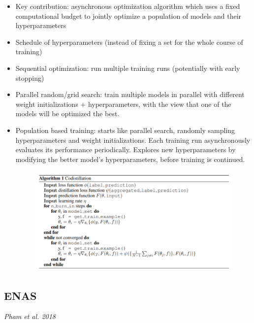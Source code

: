 \begin{itemize}
  \item Key contribution: asynchronous optimization algorithm which uses a fixed computational budget to jointly optimize a population of models and their hyperparameters
  \item Schedule of hyperparameters (instead of fixing a set for the whole course of training)
  \item Sequential optimization: run multiple training runs (potentially with early stopping)
  \item Parallel random/grid search: train multiple models in parallel with different weight initializations + hyperparameters, with the view that one of the models will be optimized the best.
  \item Population based training: starts like parallel search, randomly sampling hyperparameters and weight initializations.  Each training run asynchronously evaluates its performance periodically.  Explores new hyperparameters by modifying the better model's hyperparameters, before training is continued.

\begin{figure}[H]
   \centering
   \includegraphics[width=\textwidth]{./img/pbt.png}
\end{figure}

\end{itemize}

\subsection{ENAS}

{\it Pham et al. 2018}~\cite{pham2018efficient}

